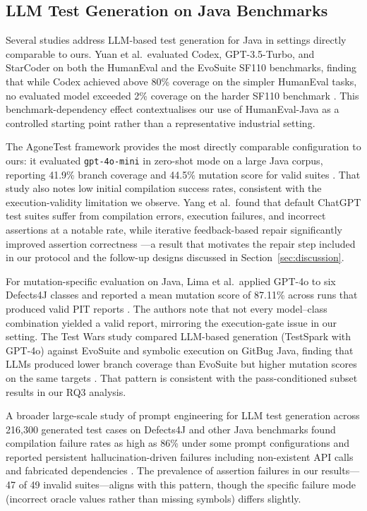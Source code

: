 \subsection{LLM Test Generation on Java Benchmarks}

Several studies address LLM-based test generation for Java in settings directly comparable to ours. Yuan et al.\ evaluated Codex, GPT-3.5-Turbo, and StarCoder on both the HumanEval and the EvoSuite SF110 benchmarks, finding that while Codex achieved above 80\% coverage on the simpler HumanEval tasks, no evaluated model exceeded 2\% coverage on the harder SF110 benchmark \cite{yuan2024junit}. This benchmark-dependency effect contextualises our use of HumanEval-Java as a controlled starting point rather than a representative industrial setting.

The AgoneTest framework provides the most directly comparable configuration to ours: it evaluated \texttt{gpt-4o-mini} in zero-shot mode on a large Java corpus, reporting 41.9\% branch coverage and 44.5\% mutation score for valid suites \cite{schafer2025agonetest}. That study also notes low initial compilation success rates, consistent with the execution-validity limitation we observe. Yang et al.\ found that default ChatGPT test suites suffer from compilation errors, execution failures, and incorrect assertions at a notable rate, while iterative feedback-based repair significantly improved assertion correctness \cite{yang2024chatgpt}---a result that motivates the repair step included in our protocol and the follow-up designs discussed in Section~\ref{sec:discussion}.

For mutation-specific evaluation on Java, Lima et al.\ applied GPT-4o to six Defects4J classes and reported a mean mutation score of 87.11\% across runs that produced valid PIT reports \cite{lima2025mutation}. The authors note that not every model--class combination yielded a valid report, mirroring the execution-gate issue in our setting. The Test Wars study compared LLM-based generation (TestSpark with GPT-4o) against EvoSuite and symbolic execution on GitBug Java, finding that LLMs produced lower branch coverage than EvoSuite but higher mutation scores on the same targets \cite{alkhateeb2025testwars}. That pattern is consistent with the pass-conditioned subset results in our RQ3 analysis.

A broader large-scale study of prompt engineering for LLM test generation across 216,300 generated test cases on Defects4J and other Java benchmarks found compilation failure rates as high as 86\% under some prompt configurations and reported persistent hallucination-driven failures including non-existent API calls and fabricated dependencies \cite{nie2026prompt}. The prevalence of assertion failures in our results---47 of 49 invalid suites---aligns with this pattern, though the specific failure mode (incorrect oracle values rather than missing symbols) differs slightly.

